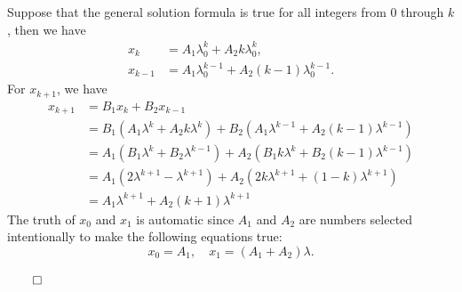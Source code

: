\begin{homeworkProblem}
\begin{enumerate}
        Suppose that the general solution formula is true for all integers from $0$
        through $k$, then we have\[
        \begin{aligned}
            x_k &= A_1 \lambda_0^k + A_2 k \lambda_0^k,\\
            x_{k-1} &= A_1 \lambda_0^{k-1} + A_2 (k-1) \lambda_0^{k-1}.
        \end{aligned}
        \]
        For $x_{k+1}$, we have \[
            \begin{aligned}
                x_{k+1} &= B_1 x_{k} + B_2 x_{k-1}\\
                &= B_1 (A_1 \lambda^k + A_2 k \lambda^k) +
                B_2 (A_1 \lambda^{k-1} + A_2 (k-1) \lambda^{k-1})\\
                &= A_1 (B_1 \lambda^k + B_2 \lambda^{k-1}) +
                A_2 (B_1 k \lambda^k + B_2 (k-1) \lambda^{k-1})\\
                &= A_1 (2\lambda^{k+1} - \lambda^{k+1}) +
                A_2 (2k\lambda^{k+1} + (1-k) \lambda^{k+1})\\
                &= A_1 \lambda^{k+1} + A_2 (k+1) \lambda^{k+1}
            \end{aligned}
        \]
        The truth of $x_0$ and $x_1$ is automatic since $A_1$ and $A_2$ are numbers
        selected intentionally to make the following equations true: \[
            x_0 = A_1, \quad x_1 = (A_1 + A_2) \lambda.
        \]
        \begin{flushright}
            $\qed$
        \end{flushright}
    

\end{enumerate}
\end{homeworkProblem}
